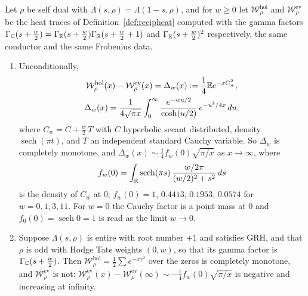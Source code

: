 \begin{theorem}\label{thm:calparity}
Let $\rho$ be self dual with $\Lambda(s,\rho)=\Lambda(1-s,\rho)$, and for $w\ge0$ let $\mathcal W^{\mathrm{hol}}_\rho$ and $\mathcal W^{\mathrm{ev}}_\rho$ be the heat traces of Definition~\ref{def:recipheat} computed with the gamma factors $\Gamma_{\mathbb{C}}(s+\frac w2)=\Gamma_{\mathbb{R}}(s+\frac w2)\Gamma_{\mathbb{R}}(s+\frac w2+1)$ and $\Gamma_{\mathbb{R}}(s+\frac w2)^2$ respectively, the same conductor and the same Frobenius data.
\begin{enumerate}
\item[(a)] Unconditionally,
\begin{gather*}
\mathcal W^{\mathrm{hol}}_\rho(x)-\mathcal W^{\mathrm{ev}}_\rho(x)=\Delta_w(x):=\frac14\mathbb{E} e^{-xC_w^2},\\
\Delta_w(x)=\frac1{4\sqrt{\pi x}}\int_0^\infty\frac{e^{-wu/2}}{\cosh(u/2)}\,e^{-u^2/4x}\,du,
\end{gather*}
where $C_w=C+\frac w2\,T$ with $C$ hyperbolic secant distributed, density $\operatorname{sech}(\pi t)$, and $T$ an independent standard Cauchy variable. So $\Delta_w$ is completely monotone, and $\Delta_w(x)\sim\frac14f_w(0)\sqrt{\pi/x}$ as $x\to\infty$, where
\[
f_w(0)=\int_{\mathbb{R}}\operatorname{sech}(\pi s)\,\frac{w/2\pi}{(w/2)^2+s^2}\,ds
\]
is the density of $C_w$ at $0$; $f_w(0)=1$, $0.4413$, $0.1953$, $0.0574$ for $w=0,1,3,11$. For $w=0$ the Cauchy factor is a point mass at $0$ and $f_0(0)=\operatorname{sech}0=1$ is read as the limit $w\to0$.
\item[(b)] Suppose $\Lambda(s,\rho)$ is entire with root number $+1$ and satisfies GRH, and that $\rho$ is odd with Hodge Tate weights $(0,w)$, so that its gamma factor is $\Gamma_{\mathbb{C}}(s+\frac w2)$. Then $\mathcal W^{\mathrm{hol}}_\rho=\frac12\sum e^{-x\gamma^2}$ over the zeros is completely monotone, and $\mathcal W^{\mathrm{ev}}_\rho$ is not: $\mathcal W^{\mathrm{ev}}_\rho(x)-\mathcal W^{\mathrm{ev}}_\rho(\infty)\sim-\frac14f_w(0)\sqrt{\pi/x}$ is negative and increasing at infinity.
\end{enumerate}
\end{theorem}

